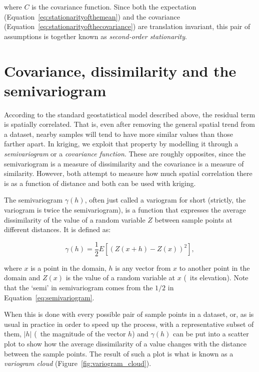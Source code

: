 where \(C\) is the covariance function.
Since both the expectation (Equation~\ref{eq:stationarityofthemean}) and the covariance (Equation~\ref{eq:stationarityofthecovariance}) are translation invariant, this pair of assumptions is together known as \emph{second-order stationarity}.

\section{Covariance, dissimilarity and the semivariogram}%

According to the standard geostatistical model described above, the residual term is spatially correlated.
That is, even after removing the general spatial trend from a dataset, nearby samples will tend to have more similar values than those farther apart.
In kriging, we exploit that property by modelling it through a \emph{semivariogram} or a \emph{covariance function}.
These are roughly opposites, since the semivariogram is a measure of dissimilarity and the covariance is a measure of similarity.
However, both attempt to measure how much spatial correlation there is as a function of distance and both can be used with kriging.

The semivariogram \(\gamma(h)\), often just called a variogram for short (strictly, the variogram is twice the semivariogram), is a function that expresses the average dissimilarity of the value of a random variable \(Z\) between sample points at different distances.
It is defined as:

\begin{equation}
\label{eq:semivariogram}
\gamma(h) = \frac{1}{2} E\left[\left(Z(x+h) - Z(x)\right)^2\right],
\end{equation}

where \(x\) is a point in the domain, \(h\) is any vector from \(x\) to another point in the domain and \(Z(x)\) is the value of a random variable at \(x\) (\eg\ its elevation).
Note that the `semi' in semivariogram comes from the \(1/2\) in Equation~\ref{eq:semivariogram}.

When this is done with every possible pair of sample points in a dataset, or, as is usual in practice in order to speed up the process, with a representative subset of them, \(|h|\) (\ie\ the magnitude of the vector \(h\)) and \(\gamma(h)\) can be put into a scatter plot to show how the average dissimilarity of a value changes with the distance between the sample points.
The result of such a plot is what is known as a \emph{variogram cloud} (Figure~\ref{fig:variogram_cloud}).

